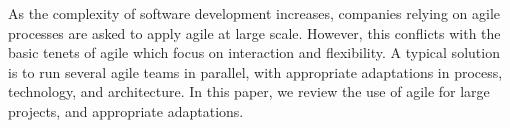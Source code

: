 As the complexity of software development increases, companies relying on agile processes are asked to apply agile at large scale.
However, this conflicts with the basic tenets of agile which focus on interaction and flexibility.
A typical solution is to run several agile teams in parallel, with appropriate adaptations in process, technology, and architecture.
In this paper, we review the use of agile for large projects, and appropriate adaptations.